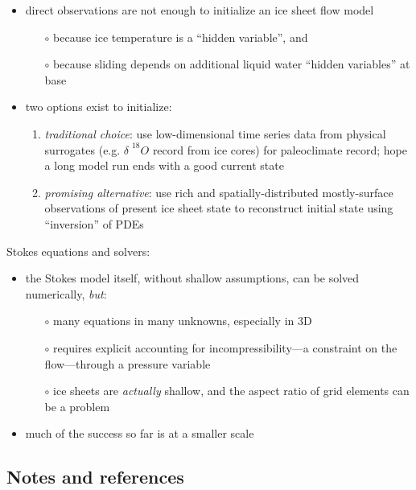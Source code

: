 \documentclass[titlepage,letterpaper,final,12pt]{scrartcl}
\newcommand{\alert}[1]{\emph{#1}}
\begin{document}
\begin{itemize}
\item direct observations are not enough to initialize an ice sheet flow model
  \begin{itemize}
  \item[$\circ$] because ice temperature is a ``hidden variable'', and
  \item[$\circ$] because sliding depends on additional liquid water ``hidden variables'' at base
  \end{itemize}
\item two options exist to initialize:
  \small
  \begin{enumerate}
  \item \emph{traditional choice}: use low-dimensional time series data from physical surrogates (e.g. $\delta \phantom{|}^{18}O$ record from ice cores) for paleoclimate record; hope a long model run ends with a good current state
  \item \emph{promising alternative}:  use rich and spatially-distributed mostly-surface observations of present ice sheet state to reconstruct initial state using ``inversion'' of PDEs
  \normalsize
  \end{enumerate}
\end{itemize}




Stokes equations and solvers:

\begin{itemize}
\item the Stokes model itself, without shallow assumptions, can be solved numerically, \alert{but}:
  \begin{itemize}
  \item[$\circ$] many equations in many unknowns, especially in 3D
  \item[$\circ$] requires explicit accounting for incompressibility---a constraint on the flow---through a pressure variable
  \item[$\circ$] ice sheets are \emph{actually} shallow, and the aspect ratio of grid elements can be a problem
  \end{itemize}
\item much of the success so far is at a smaller scale
\end{itemize}


\small
\subsection{Notes and references} \label{sec:nr}
\end{document}
